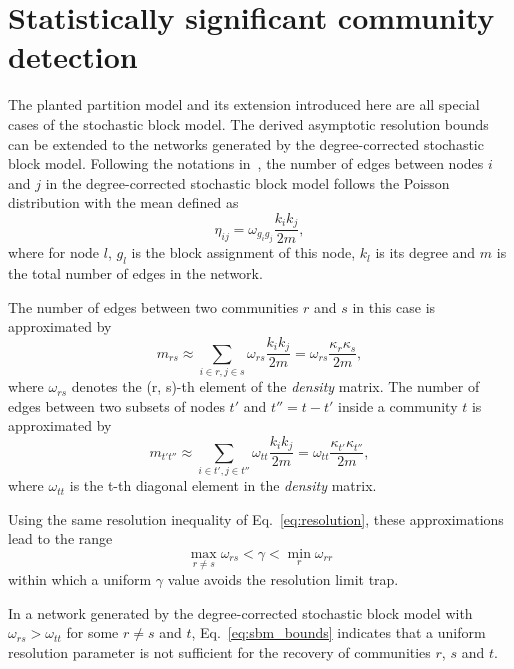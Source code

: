 \section{Statistically significant community detection} \label{sec:2.4}
The planted partition model and its extension introduced here are all special cases of the stochastic block model. The derived asymptotic resolution bounds can be extended to the networks generated by the degree-corrected stochastic block model. Following the notations in~\cite{newman2016equivalence}, the number of edges between nodes $i$ and $j$ in the degree-corrected stochastic block model follows the Poisson distribution with the mean defined as 
\begin{equation} \label{eq:sbm_newman_definition}
\eta_{ij} = \omega_{g_i g_j} \frac{k_i k_j}{2m},
\end{equation}
where for node $l$, $g_l$ is the block assignment of this node, $k_l$ is its degree and $m$ is the total number of edges in the network.

The number of edges between two communities $r$ and $s$ in this case is approximated by 
\begin{equation} \label{eq:approx_out2}
    m_{rs} \approx \sum_{i\in r, j\in s} \omega_{rs} \frac{k_i k_j}{2m} = \omega_{rs} \frac{\kappa_r \kappa_s}{2m},
\end{equation}
where $\omega_{rs}$ denotes the (r, s)-th element of the {\it density} matrix. The number of edges between two subsets of nodes $t'$ and $t''=t - t'$ inside a community $t$ is approximated by
\begin{equation} \label{eq:approx_in2}
    m_{t't''} \approx \sum_{i\in t',j\in t''} \omega_{tt} \frac{k_i k_j}{2m} = \omega_{tt} \frac{\kappa_{t'} \kappa_{t''}}{2m},
\end{equation}
where $\omega_{tt}$ is the t-th diagonal element in the {\it density} matrix.

Using the same resolution inequality of Eq.~\ref{eq:resolution}, these approximations lead to the range
\begin{equation} \label{eq:sbm_bounds}
    \max_{r\neq s} \omega_{rs} < \gamma < \min_{r} \omega_{rr}
\end{equation}
within which a uniform $\gamma$ value avoids the resolution limit trap. 

In a network generated by the degree-corrected stochastic block model with $\omega_{rs} > \omega_{tt}$ for some $r \neq s$ and $t$, Eq.~\ref{eq:sbm_bounds} indicates that a uniform resolution parameter is not sufficient for the recovery of communities $r$, $s$ and $t$.

